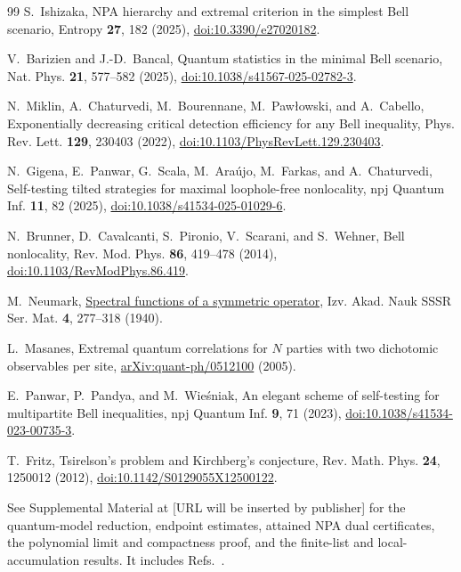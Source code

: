\begin{thebibliography}{99}
S.~Ishizaka,
NPA hierarchy and extremal criterion in the simplest Bell scenario,
Entropy \textbf{27}, 182 (2025),
\href{https://doi.org/10.3390/e27020182}{doi:10.3390/e27020182}.

V.~Barizien and J.-D.~Bancal,
Quantum statistics in the minimal Bell scenario,
Nat. Phys. \textbf{21}, 577--582 (2025),
\href{https://doi.org/10.1038/s41567-025-02782-3}{doi:10.1038/s41567-025-02782-3}.

N.~Miklin, A.~Chaturvedi, M.~Bourennane, M.~Paw\l{}owski, and A.~Cabello,
Exponentially decreasing critical detection efficiency for any Bell inequality,
Phys. Rev. Lett. \textbf{129}, 230403 (2022),
\href{https://doi.org/10.1103/PhysRevLett.129.230403}{doi:10.1103/PhysRevLett.129.230403}.

N.~Gigena, E.~Panwar, G.~Scala, M.~Ara\'ujo, M.~Farkas, and A.~Chaturvedi,
Self-testing tilted strategies for maximal loophole-free nonlocality,
npj Quantum Inf. \textbf{11}, 82 (2025), \href{https://doi.org/10.1038/s41534-025-01029-6}{doi:10.1038/s41534-025-01029-6}.

N.~Brunner, D.~Cavalcanti, S.~Pironio, V.~Scarani, and S.~Wehner,
Bell nonlocality, Rev. Mod. Phys. \textbf{86}, 419--478 (2014),
\href{https://doi.org/10.1103/RevModPhys.86.419}{doi:10.1103/RevModPhys.86.419}.

M.~Neumark,
\href{https://www.mathnet.ru/eng/im3893}{Spectral functions of a symmetric operator},
Izv. Akad. Nauk SSSR Ser. Mat. \textbf{4}, 277--318 (1940).

L.~Masanes, Extremal quantum correlations for $N$ parties with two dichotomic observables per site, \href{https://arxiv.org/abs/quant-ph/0512100}{arXiv:quant-ph/0512100} (2005).

E.~Panwar, P.~Pandya, and M.~Wie\'sniak,
An elegant scheme of self-testing for multipartite Bell inequalities,
npj Quantum Inf. \textbf{9}, 71 (2023), \href{https://doi.org/10.1038/s41534-023-00735-3}{doi:10.1038/s41534-023-00735-3}.

T.~Fritz, Tsirelson's problem and Kirchberg's conjecture, Rev. Math. Phys. \textbf{24}, 1250012 (2012), \href{https://doi.org/10.1142/S0129055X12500122}{doi:10.1142/S0129055X12500122}.

See Supplemental Material at [URL will be inserted by publisher] for the quantum-model reduction, endpoint estimates, attained NPA dual certificates, the polynomial limit and compactness proof, and the finite-list and local-accumulation results. It includes Refs.~\cite{Halmos1969,ScholzWerner2008,PironioEtAl2010,BoydVandenberghe2004,VandenbergheBoyd1996,Hilbert1888,Tarski1951}.


\end{thebibliography}
